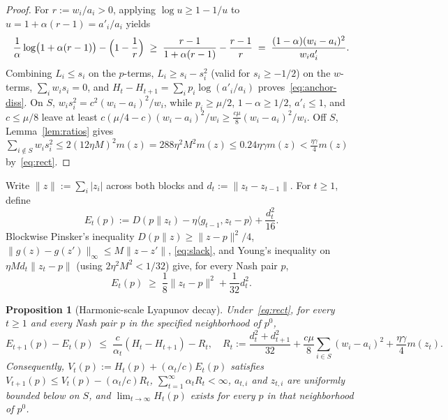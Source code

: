 \documentclass[11pt]{article}
\theoremstyle{plain}
\newtheorem{proposition}[theorem]{Proposition}
\theoremstyle{definition}
\theoremstyle{remark}
\begin{document}
\begin{proof}
For $r := w_i/a_i > 0$, applying $\log u \ge 1 - 1/u$ to $u = 1 + \alpha(r-1) = a'_i/a_i$ yields
\[
\frac{1}{\alpha}\log\bigl(1 + \alpha(r-1)\bigr) - \Bigl(1 - \frac{1}{r}\Bigr)
\;\ge\; \frac{r - 1}{1 + \alpha(r-1)} - \frac{r - 1}{r}
\;=\; \frac{(1-\alpha)(w_i - a_i)^2}{w_i a'_i}.
\]
Combining $L_i \le s_i$ on the $p$-terms, $L_i \ge s_i - s_i^2$ (valid for $s_i \ge -1/2$) on the $w$-terms, $\sum_i w_i s_i = 0$, and $H_t - H_{t+1} = \sum_i p_i \log(a'_i/a_i)$ proves~\eqref{eq:anchor-diss}. On $S$, $w_i s_i^2 = c^2(w_i - a_i)^2/w_i$, while $p_i \ge \mu/2$, $1-\alpha \ge 1/2$, $a'_i \le 1$, and $c \le \mu/8$ leave at least $c(\mu/4 - c)(w_i - a_i)^2/w_i \ge \frac{c\mu}{8}(w_i - a_i)^2/w_i$. Off $S$, Lemma~\ref{lem:ratios} gives $\sum_{i \notin S} w_i s_i^2 \le 2(12\eta M)^2 m(z) = 288\eta^2 M^2 m(z) \le 0.24\eta\gamma m(z) < \frac{\eta\gamma}{4}m(z)$ by~\eqref{eq:rect}.
\end{proof}

Write $\|z\| := \sum_i |z_i|$ across both blocks and $d_t := \|z_t - z_{t-1}\|$. For $t \ge 1$, define
\[
E_t(p) := D(p \| z_t) - \eta\langle g_{t-1}, z_t - p \rangle + \frac{d_t^2}{16}.
\]
Blockwise Pinsker's inequality $D(p \| z) \ge \|z - p\|^2/4$, $\|g(z) - g(z')\|_\infty \le M\|z - z'\|$, \eqref{eq:slack}, and Young's inequality on $\eta M d_t\|z_t - p\|$ (using $2\eta^2 M^2 < 1/32$) give, for every Nash pair $p$,
\begin{equation}\label{eq:coercive}
E_t(p) \;\ge\; \frac{1}{8}\|z_t - p\|^2 + \frac{1}{32}d_t^2.
\end{equation}

\begin{proposition}[Harmonic-scale Lyapunov decay]\label{prop:lyap}
Under~\eqref{eq:rect}, for every $t \ge 1$ and every Nash pair $p$ in the specified neighborhood of $p^0$,
\begin{equation}\label{eq:step-decay}
E_{t+1}(p) - E_t(p) \;\le\; \frac{c}{\alpha_t}(H_t - H_{t+1}) - R_t,
\quad
R_t := \frac{d_t^2 + d_{t+1}^2}{32} + \frac{c\mu}{8}\sum_{i \in S}(w_i - a_i)^2 + \frac{\eta\gamma}{4} m(z_t).
\end{equation}
Consequently, $V_t(p) := H_t(p) + (\alpha_t/c) E_t(p)$ satisfies $V_{t+1}(p) \le V_t(p) - (\alpha_t/c) R_t$, $\sum_{t=1}^\infty \alpha_t R_t < \infty$, $a_{t,i}$ and $z_{t,i}$ are uniformly bounded below on $S$, and $\lim_{t \to \infty} H_t(p)$ exists for every $p$ in that neighborhood of $p^0$.
\end{proposition}
\end{document}
